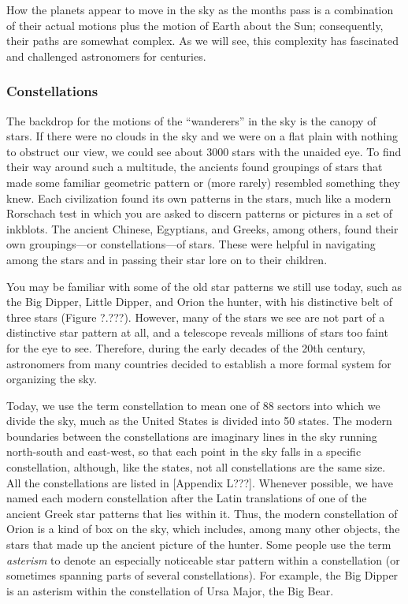 \documentclass[../../main-astronomy.tex]{subfiles}
\begin{document}
\vspace{1em}

How the planets appear to move in the sky as the months pass is a combination of their actual motions plus the motion of Earth about the Sun; consequently, their paths are somewhat complex. As we will see, this complexity has fascinated and challenged astronomers for centuries.

\subsubsection*{Constellations}

The backdrop for the motions of the ``wanderers'' in the sky is the canopy of stars. If there were no clouds in the sky and we were on a flat plain with nothing to obstruct our view, we could see about 3000 stars with the unaided eye. To find their way around such a multitude, the ancients found groupings of stars that made some familiar geometric pattern or (more rarely) resembled something they knew. Each civilization found its own patterns in the stars, much like a modern Rorschach test in which you are asked to discern patterns or pictures in a set of inkblots. The ancient Chinese, Egyptians, and Greeks, among others, found their own groupings---or constellations---of stars. These were helpful in navigating among the stars and in passing their star lore on to their children.

\vspace{1em}

You may be familiar with some of the old star patterns we still use today, such as the Big Dipper, Little Dipper, and Orion the hunter, with his distinctive belt of three stars (Figure ?.???). However, many of the stars we see are not part of a distinctive star pattern at all, and a telescope reveals millions of stars too faint for the eye to see. Therefore, during the early decades of the 20th century, astronomers from many countries decided to establish a more formal system for organizing the sky.


\vspace{1em}

Today, we use the term constellation to mean one of 88 sectors into which we divide the sky, much as the United States is divided into 50 states. The modern boundaries between the constellations are imaginary lines in the sky running north-south and east-west, so that each point in the sky falls in a specific constellation, although, like the states, not all constellations are the same size. All the constellations are listed in [Appendix L???]. Whenever possible, we have named each modern constellation after the Latin translations of one of the ancient Greek star patterns that lies within it. Thus, the modern constellation of Orion is a kind of box on the sky, which includes, among many other objects, the stars that made up the ancient picture of the hunter. Some people use the term \textit{asterism} to denote an especially noticeable star pattern within a constellation (or sometimes spanning parts of several constellations). For example, the Big Dipper is an asterism within the constellation of Ursa Major, the Big Bear.
\end{document}
